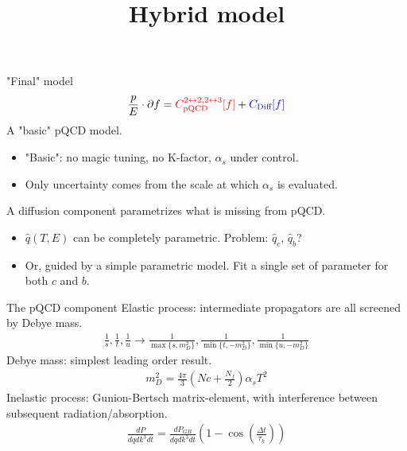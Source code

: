 \documentclass[11pt]{beamer}
\title{Hybrid model}
\begin{document}
\begin{frame}
\titlepage
\end{frame}


\begin{frame}{"Final" model}
\begin{eqnarray}
\nonumber
\frac{p}{E}\cdot \partial f = {\color{red} C^{2\leftrightarrow 2, 2\leftrightarrow 3}_{\textrm{pQCD}}[f]} + {\color{blue} C_{\textrm{Diff}}[f]}
\end{eqnarray}
{\color{red} A "basic" pQCD model.}
\begin{itemize}
\item "Basic": no magic tuning, no K-factor, $\alpha_s$ under control.
\item Only uncertainty comes from the scale at which $\alpha_s$ is evaluated.
\end{itemize}
{\color{blue} A diffusion component parametrizes what is missing from pQCD.}
\begin{itemize}
\item $\hat{q}(T, E)$ can be completely parametric. Problem: $\hat{q}_c$, $\hat{q}_b$?
\item Or, guided by a simple parametric model. Fit a single set of parameter for both $c$ and $b$.
\end{itemize}
\end{frame}

\begin{frame}{The pQCD component}
Elastic process: intermediate propagators are all screened by Debye mass.
\begin{eqnarray}
\nonumber
\frac{1}{s}, \frac{1}{t}, \frac{1}{u} \rightarrow \frac{1}{\max\{s,m_D^2\}}, \frac{1}{\min\{t,-m_D^2\}}, \frac{1}{\min\{u,-m_D^2\}}
\end{eqnarray}
Debye mass: simplest leading order result.
\begin{eqnarray}
\nonumber
m_D^2 = \frac{4\pi}{3}\left(Nc+\frac{N_f}{2}\right)\alpha_s T^2
\end{eqnarray}
Inelastic process: Gunion-Bertsch matrix-element, with interference between subsequent radiation/absorption.
\begin{eqnarray}
\nonumber
\frac{dP}{dq dk^3 dt} = \frac{dP_{GB}}{dq dk^3 dt} \left(1-\cos\left(\frac{\Delta t}{\tau_k}\right)\right)
\end{eqnarray}
\end{frame}
\end{document}
